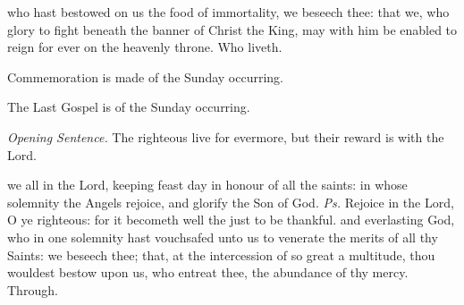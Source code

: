 \postcommunion
{} who hast bestowed on us the food of immortality, we beseech thee: that we, who glory to fight beneath the banner of Christ the King, may with him be enabled to reign for ever on the heavenly throne. Who liveth.
\begin{rubric}
    Commemoration is made of the Sunday occurring.
\end{rubric}
\begin{rubric}
    The Last Gospel is of the Sunday occurring.
\end{rubric}


\clearpage
{}
\par\noindent
\textit{Opening Sentence.} The righteous live for evermore, but their reward is with the Lord.

\introit
{} we all in the Lord, keeping feast day in honour of all the saints: in whose solemnity the Angels rejoice, and glorify the Son of God. \textit{Ps.} Rejoice in the Lord, O ye righteous: for it becometh well the just to be thankful.
\collect\label{AllHallowsCollect}
 and everlasting God, who in one solemnity hast vouchsafed unto us to venerate the merits of all thy Saints: we beseech thee; that, at the intercession of so great a multitude, thou wouldest bestow upon us, who entreat thee, the abundance of thy mercy. Through.

